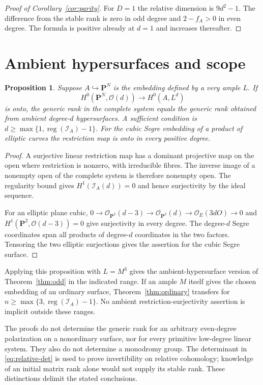 \documentclass[11pt]{article}
\newtheorem{proposition}[theorem]{Proposition}
\theoremstyle{definition}\newtheorem{definition}[theorem]{Definition}
\theoremstyle{remark}\newtheorem{remark}[theorem]{Remark}
\newcommand{\OO}{\mathcal O}
\newcommand{\PP}{\mathbf P}
\begin{document}
\begin{proof}[Proof of Corollary~\ref{cor:parity}]
For $D=1$ the relative dimension is $9d^2-1$. The difference from the stable rank is zero in odd degree and $2-f_A>0$ in even degree. The formula is positive already at $d=1$ and increases thereafter.
\end{proof}

\section{Ambient hypersurfaces and scope}

\begin{proposition}\label{prop:ambient}
Suppose $A\hookrightarrow\PP^N$ is the embedding defined by a very ample $L$. If
\[
 H^0(\PP^N,\OO(d))\longrightarrow H^0(A,L^d)
\]
is onto, the generic rank in the complete system equals the generic rank obtained from ambient degree-$d$ hypersurfaces. A sufficient condition is
$d\ge\max\{1,\operatorname{reg}(\mathcal I_A)-1\}$.
For the cubic Segre embedding of a product of elliptic curves the restriction map is onto in every positive degree.
\end{proposition}
\begin{proof}
A surjective linear restriction map has a dominant projective map on the open where restriction is nonzero, with irreducible fibres. The inverse image of a nonempty open of the complete system is therefore nonempty open. The regularity bound gives $H^1(\mathcal I_A(d))=0$ and hence surjectivity by the ideal sequence.

For an elliptic plane cubic, $0\to\OO_{\PP^2}(d-3)\to\OO_{\PP^2}(d)\to\OO_E(3dO)\to0$ and $H^1(\PP^2,\OO(d-3))=0$ give surjectivity in every degree. The degree-$d$ Segre coordinates span all products of degree-$d$ coordinates in the two factors. Tensoring the two elliptic surjections gives the assertion for the cubic Segre surface.
\end{proof}

Applying this proposition with $L=M^3$ gives the ambient-hypersurface version of Theorem~\ref{thm:odd} in the indicated range. If an ample $M$ itself gives the chosen embedding of an ordinary surface, Theorem~\ref{thm:ordinary} transfers for
$n\ge\max\{3,\operatorname{reg}(\mathcal I_A)-1\}$.
No ambient restriction-surjectivity assertion is implicit outside these ranges.

The proofs do not determine the generic rank for an arbitrary even-degree polarization on a nonordinary surface, nor for every primitive low-degree linear system. They also do not determine a monodromy group. The determinant in \eqref{eq:relative-det} is used to prove invertibility on relative cohomology; knowledge of an initial matrix rank alone would not supply its stable rank. These distinctions delimit the stated conclusions.
\end{document}

